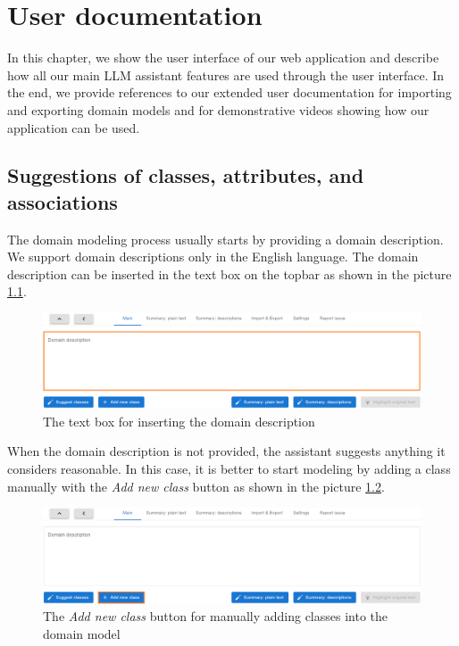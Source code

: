 \chapter{User documentation}
\label{chap:user_documentation}

In this chapter, we show the user interface of our web application and describe how all our main LLM assistant features are used through the user interface. In the end, we provide references to our extended user documentation for importing and exporting domain models and for demonstrative videos showing how our application can be used. 


\section{Suggestions of classes, attributes, and associations}

The domain modeling process usually starts by providing a domain description. We support domain descriptions only in the English language. The domain description can be inserted in the text box on the topbar as shown in the picture \ref{fig:domain-description-text-box}.

\begin{figure}[!h]
    \includegraphics[scale=0.29]{../docs/images/frontend/insert-domain-description.png}
    \caption{\centering The text box for inserting the domain description}
    \label{fig:domain-description-text-box}
\end{figure}

When the domain description is not provided, the assistant suggests anything it considers reasonable. In this case, it is better to start modeling by adding a class manually with the \textit{Add new class} button as shown in the picture \ref{fig:add_new_class}.

\begin{figure}[!h]
    \includegraphics[scale=0.29]{../docs/images/frontend/add-new-class-manually.png}
    \caption{\centering The \textit{Add new class} button for manually adding classes into the domain model}
    \label{fig:add_new_class}
\end{figure}

